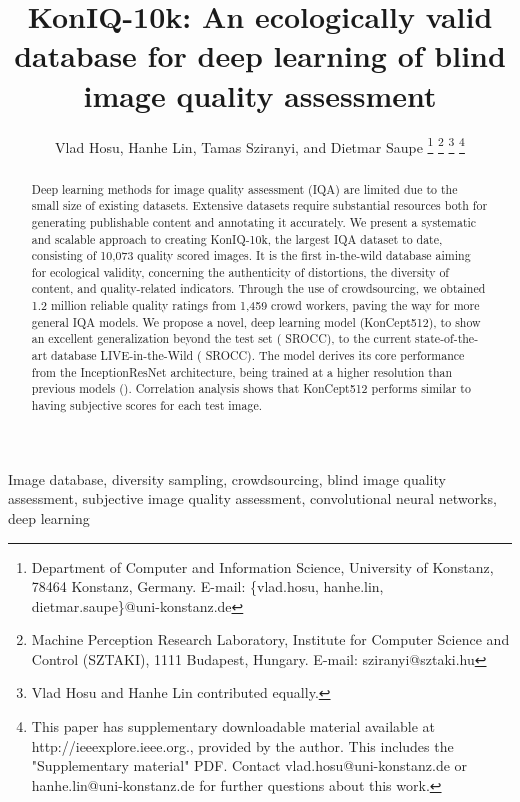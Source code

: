 \documentclass[10pt,journal,compsoc]{IEEEtran}
\begin{document}
\title{KonIQ-10k: An ecologically valid database for deep learning of blind image quality assessment}



\author{Vlad Hosu, Hanhe Lin, Tamas Sziranyi, and Dietmar Saupe
	\thanks{Department of Computer and Information Science, University of Konstanz, 78464 Konstanz, Germany.
E-mail: \{vlad.hosu, hanhe.lin, dietmar.saupe\}@uni-konstanz.de}
    \thanks{Machine Perception Research Laboratory, Institute for Computer Science and Control (SZTAKI), 1111 Budapest, Hungary.
E-mail: sziranyi@sztaki.hu}
	\thanks{Vlad Hosu and Hanhe Lin contributed equally.}
	\thanks{This paper has supplementary downloadable material available at http://ieeexplore.ieee.org., provided by the author. This includes the "Supplementary material" PDF. Contact vlad.hosu@uni-konstanz.de or hanhe.lin@uni-konstanz.de for further questions about this work.}
}






















\maketitle

\begin{abstract}
Deep learning methods for image quality assessment (IQA) are limited due to the small size of existing datasets. Extensive datasets require substantial resources both for generating publishable content and annotating it accurately.
We present a systematic and scalable approach to creating KonIQ-10k, the largest IQA dataset to date, consisting of 10,073 quality scored images. It is the first in-the-wild database aiming for ecological validity, concerning the authenticity of distortions, the diversity of content, and quality-related indicators. Through the use of crowdsourcing, we obtained 1.2 million reliable quality ratings from 1,459 crowd workers, paving the way for more general IQA models.
We propose a novel, deep learning model (KonCept512), to show an excellent generalization beyond the test set ( SROCC), to the current state-of-the-art database LIVE-in-the-Wild ( SROCC). The model derives its core performance from the InceptionResNet architecture, being trained at a higher resolution than previous models (). Correlation analysis shows that KonCept512 performs similar to having  subjective scores for each test image.

\end{abstract}
\begin{IEEEkeywords}
Image database, diversity sampling, crowdsourcing, blind image quality assessment, subjective image quality assessment, convolutional neural networks, deep learning
\end{IEEEkeywords}
\end{document}
